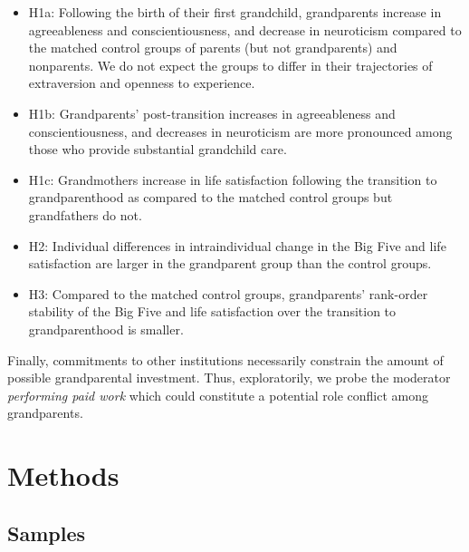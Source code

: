 \documentclass[
  english,
  man, noextraspace]{apa7}
\providecommand{\tightlist}{%
  \setlength{\itemsep}{0pt}\setlength{\parskip}{0pt}}
\begin{document}
\begin{itemize}
\tightlist
\item
  H1a: Following the birth of their first grandchild, grandparents increase in agreeableness and conscientiousness, and decrease in neuroticism compared to the matched control groups of parents (but not grandparents) and nonparents. We do not expect the groups to differ in their trajectories of extraversion and openness to experience.
\item
  H1b: Grandparents' post-transition increases in agreeableness and conscientiousness, and decreases in neuroticism are more pronounced among those who provide substantial grandchild care.
\item
  H1c: Grandmothers increase in life satisfaction following the transition to grandparenthood as compared to the matched control groups but grandfathers do not.
\item
  H2: Individual differences in intraindividual change in the Big Five and life satisfaction are larger in the grandparent group than the control groups.
\item
  H3: Compared to the matched control groups, grandparents' rank-order stability of the Big Five and life satisfaction over the transition to grandparenthood is smaller.
\end{itemize}

Finally, commitments to other institutions necessarily constrain the amount of possible grandparental investment. Thus, exploratorily, we probe the moderator \emph{performing paid work} which could constitute a potential role conflict among grandparents.

\hypertarget{methods}{%
\section{Methods}\label{methods}}

\hypertarget{samples}{%
\subsection{Samples}\label{samples}}
\end{document}
